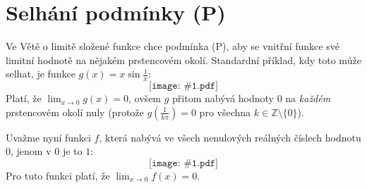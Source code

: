 \documentclass[12pt,a4paper]{article}
\def\Z{\mathbb Z}
\def\graf#1{\[\texttt{[image: \#1.pdf]}\]}
\begin{document}
\section*{Selhání podmínky (P)}

Ve Větě o limitě složené funkce chce podmínka (P), aby se vnitřní funkce  své limitní hodnotě na nějakém prstencovém okolí. Standardní příklad, kdy toto může selhat, je funkce $g(x) = x \sin \frac 1x$:
\graf{grafy/sincrazy}
Platí, že $\lim_{x \to 0} g(x) = 0$, ovšem $g$ přitom nabývá hodnoty $0$ na \emph{každém} prstencovém okolí nuly (protože $g(\frac{1}{k\pi}) = 0$ pro všechna $k \in \Z \setminus \{0\}$).

Uvažme nyní funkci $f$, která nabývá ve všech nenulových reálných číslech hodnotu $0$, jenom v $0$ je to $1$:
\graf{grafy_p/dira}
Pro tuto funkci platí, že $\lim_{x \to 0} f(x) = 0$.
\end{document}
